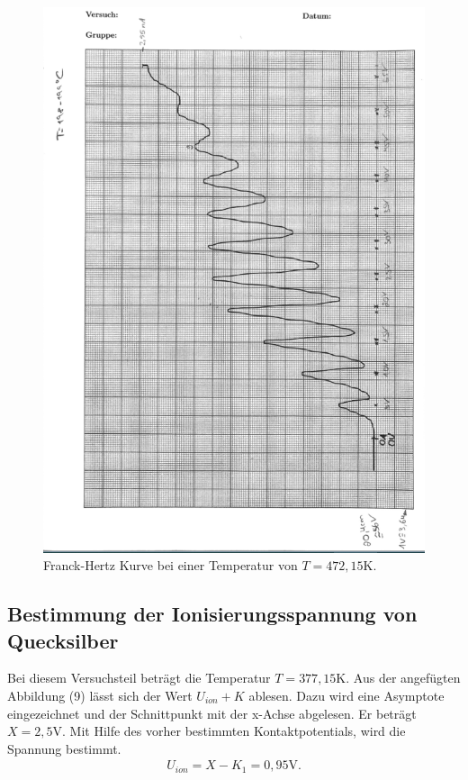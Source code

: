 \begin{figure}[H]
  \centering
  \includegraphics{FranckHertz.PNG}
  \caption{Franck-Hertz Kurve bei einer Temperatur von $T=472,15 \si{\K}$.}
  \label{fig:plot}
\end{figure}


\subsection{Bestimmung der Ionisierungsspannung von Quecksilber}
Bei diesem Versuchsteil beträgt die Temperatur $T= 377,15\si{\K}$.
Aus der angefügten Abbildung (9) lässt sich der Wert $U_{ion}+K$ ablesen.
Dazu wird eine Asymptote eingezeichnet und der Schnittpunkt mit der x-Achse abgelesen.
Er beträgt $X = 2,5 \si{\V}$. Mit Hilfe des vorher bestimmten Kontaktpotentials, wird die Spannung bestimmt.
\begin{align*}
U_{ion} = X-K_1 = 0,95\si{\V}.
\end{align*}

